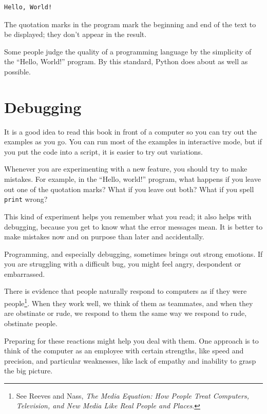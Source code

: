 \documentclass[10pt]{book}
\begin{document}

\beforeverb
\begin{verbatim}
Hello, World!
\end{verbatim}
\afterverb
%
The quotation marks in the program mark the beginning and end
of the text to be displayed; they don't appear in the result.


Some people judge the quality of a programming language by the
simplicity of the ``Hello, World!'' program.  By this standard, Python
does about as well as possible.


\section{Debugging}

It is a good idea to read this book in front of a computer so you can
try out the examples as you go.  You can run most of the examples in
interactive mode, but if you put the code into a script, it is easier
to try out variations.

Whenever you are experimenting with a new feature, you should try
to make mistakes.  For example, in the ``Hello, world!'' program,
what happens if you leave out one of the quotation marks?  What
if you leave out both?  What if you spell {\tt print} wrong?


This kind of experiment helps you remember what you read; it also helps
with debugging, because you get to know what the error messages mean.
It is better to make mistakes now and on purpose than later
and accidentally.

Programming, and especially debugging, sometimes brings out strong
emotions.  If you are struggling with a difficult bug, you might 
feel angry, despondent or embarrassed.

There is evidence that people naturally respond to computers as if
they were people\footnote{See Reeves and Nass, {\it The Media
    Equation: How People Treat Computers, Television, and New Media
    Like Real People and Places}.}.  When they work well, we think
of them as teammates, and when they are obstinate or rude, we
respond to them the same way we respond to rude,
obstinate people.


Preparing for these reactions might help you deal with them.
One approach is to think of the computer as an employee with
certain strengths, like speed and precision, and
particular weaknesses, like lack of empathy and inability
to grasp the big picture.
\end{document}
